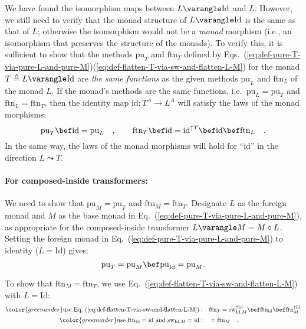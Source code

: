 We have found the isomorphism maps between $L\varangle\text{Id}$
and $L$. However, we still need to verify that the monad structure
of $L\varangle\text{Id}$ is the same as that of $L$; otherwise the
isomorphism would not be a \emph{monad} morphism (i.e., an isomorphism
that preserves the structure of the monads). To verify this, it is
sufficient to show that the methods $\text{pu}_{T}$ and $\text{ftn}_{T}$
defined by Eqs.~(\ref{eq:def-pure-T-via-pure-L-and-pure-M})\textendash (\ref{eq:def-flatten-T-via-sw-and-flatten-L-M})
for the monad $T\triangleq L\varangle\text{Id}$ are \emph{the same
functions} as the given methods $\text{pu}_{L}$ and $\text{ftn}_{L}$
of the monad $L$. If the monad\textsf{'}s methods are the same functions,
i.e.~$\text{pu}_{L}=\text{pu}_{T}$ and $\text{ftn}_{L}=\text{ftn}_{T}$,
then the identity map $\text{id}:T^{A}\rightarrow L^{A}$ will satisfy
the laws of the monad morphisms:
\[
\text{pu}_{T}\bef\text{id}=\text{pu}_{L}\quad,\quad\quad\text{ftn}_{T}\bef\text{id}=\text{id}^{\uparrow T}\bef\text{id}\bef\text{ftn}_{L}\quad.
\]
In the same way, the laws of the monad morphisms will hold for \textsf{``}$\text{id}$\textsf{''}
in the direction $L\leadsto T$. 

\paragraph{For composed-inside transformers:}

We need to show that $\text{pu}_{M}=\text{pu}_{T}$ and $\text{ftn}_{M}=\text{ftn}_{T}$.
Designate $L$ as the foreign monad and $M$ as the base monad in
Eq.~(\ref{eq:def-pure-T-via-pure-L-and-pure-M}), as appropriate
for the composed-inside transformer $L\varangle M=M\circ L$. Setting
the foreign monad in Eq.~(\ref{eq:def-pure-T-via-pure-L-and-pure-M})
to identity ($L=\text{Id}$) gives:
\[
\text{pu}_{T}=\text{pu}_{M}\bef\text{pu}_{\text{Id}}=\text{pu}_{M}.
\]

To show that $\text{ftn}_{M}=\text{ftn}_{T}$, we use Eq.~(\ref{eq:def-flatten-T-via-sw-and-flatten-L-M})
with $L=\text{Id}$:
\begin{align*}
{\color{greenunder}\text{use Eq.~(\ref{eq:def-flatten-T-via-sw-and-flatten-L-M})}:}\quad & \text{ftn}_{T}=\text{sw}_{\text{Id},M}^{\uparrow\text{Id}}\bef\text{ftn}_{\text{Id}}\bef\text{ftn}_{M}^{\uparrow\text{Id}}\\
{\color{greenunder}\text{use }\text{ftn}_{\text{Id}}=\text{id}\text{ and }\text{sw}_{\text{Id},M}=\text{id}:}\quad & =\text{ftn}_{M}\quad.
\end{align*}



